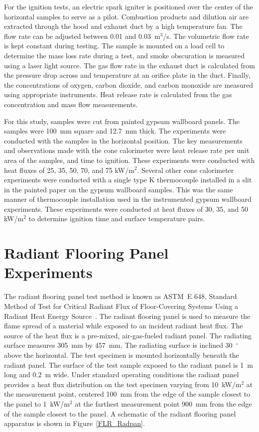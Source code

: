 \documentclass[twoside]{uocthesis}
\begin{document}
{For the ignition tests, an electric spark igniter is positioned over the center of the horizontal samples to serve as a pilot.  Combustion products and dilution air are extracted through the hood and exhaust duct by a high temperature fan. The flow rate can be adjusted between 0.01 and 0.03~m$^3$/s. The volumetric flow rate is kept constant during testing. The sample is mounted on a load cell to determine the mass loss rate during a test, and smoke obscuration is measured using a laser light source. The gas flow rate in the exhaust duct is calculated from the pressure drop across and temperature at an orifice plate in the duct. Finally, the concentrations of oxygen, carbon dioxide, and carbon monoxide are measured using appropriate instruments. Heat release rate is calculated from the gas concentration and mass flow measurements.

For this study, samples were cut from painted gypsum wallboard panels. The samples were 100~mm square and 12.7~mm thick. The experiments were conducted with the samples in the horizontal position.  The key measurements and observations made with the cone calorimeter were heat release rate per unit area of the samples, and time to ignition. These experiments were conducted with heat fluxes of 25, 35, 50, 70, and 75 kW/m$^2$. Several other cone calorimeter experiments were conducted with a single type K thermocouple installed in a slit in the painted paper on the gypsum wallboard samples.  This was the same manner of thermocouple installation used in the instrumented gypsum  wallboard experiments.  These experiments were conducted at heat fluxes of 30, 35, and 50 kW/m$^2$ to determine ignition time and surface temperature pairs.

\section{Radiant Flooring Panel Experiments}

The radiant flooring panel test method is known as ASTM~E 648, Standard Method of Test for Critical Radiant Flux of Floor-Covering Systems Using a Radiant Heat Energy Source~\cite{ASTM_E648}.  The radiant flooring panel is used to measure the flame spread of a material while exposed to an incident radiant heat flux. The source of the heat flux is a pre-mixed, air-gas-fueled radiant panel.  The radiating surface measures 305~mm by 457~mm. The radiating surface is inclined 30~$^{\circ}$ above the horizontal. The test specimen is mounted horizontally beneath the radiant panel.  The surface of the test sample exposed to the radiant panel is 1~m long and 0.2~m wide. Under standard operating conditions the radiant panel provides a heat flux distribution on the test specimen varying from 10~kW/m$^2$ at the measurement point, centered 100~mm from the edge of the sample closest to the panel to 1~kW/m$^2$ at the farthest measurement point 900~mm from the edge of the sample closest to the panel. A schematic of the radiant flooring panel apparatus is shown in Figure~\ref{FLR_Radpan}.  

}
\end{document}
